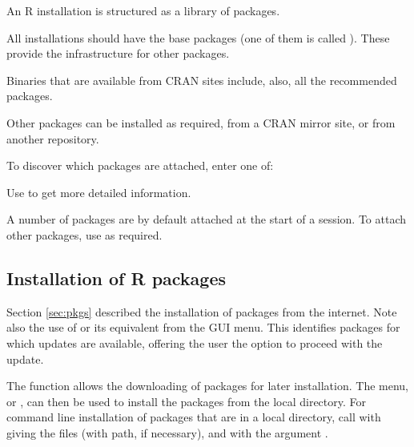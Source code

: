 \noindent
An R installation is structured as a library of packages.
\begin{itemizz}
\item All installations should have the base packages (one of them is
  called ).  These provide the infrastructure for other
  packages.
\item Binaries that are available from CRAN sites include, also, all
the recommended packages.
\item Other packages can be installed as required, from a CRAN mirror
site, or from another repository.
\end{itemizz}

\begin{marginfigure}[12pt]
To discover which packages are attached, enter one of:
\begin{knitrout}
\color{fgcolor}\begin{kframe}
\begin{alltt}
\hlstd{()}
\hlstd{()}
\end{alltt}
\end{kframe}
\end{knitrout}
Use  to get more detailed information.
\end{marginfigure}
A number of packages are by default attached
at the start of a session.  To attach other packages, use
 as required.

\subsection{Installation of R packages}\label{ss:installpack}
Section \ref{sec:pkgs} described the installation of packages from the
internet. Note also the use of  or its
equivalent from the GUI menu.  This identifies packages for which
updates are available, offering the user the option to proceed with
the update.

The function  allows the downloading of
packages for later installation.  The menu, or
, can then be used to install the packages
from the local directory.  For command line installation of packages that
are in a local directory, call  with
 giving the files (with path, if necessary), and with the
argument .

